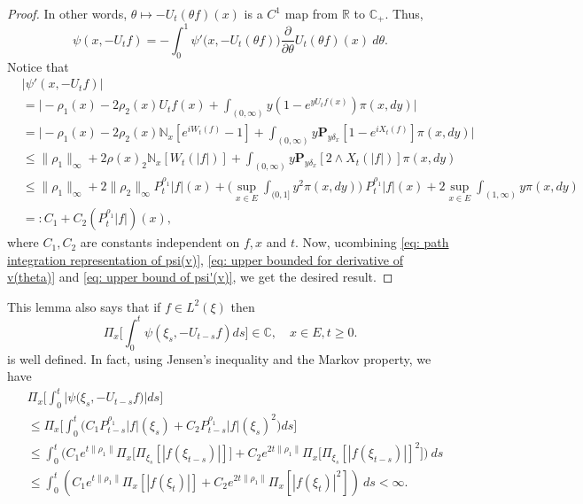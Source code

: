 \documentclass[12pt,a4paper]{amsart}
\theoremstyle{plain}
\theoremstyle{definition}
\numberwithin{equation}{section}
\begin{document}
\begin{proof}
    In other words, $\theta \mapsto -U_t(\theta f)(x)$ is a $C^1$ map from $\mathbb R$ to $\mathbb C_+$.
Thus,
\begin{equation}
\label{eq: path integration representation of psi(v)}
    \psi(x,-U_tf) = -\int_0^1 \psi'\big(x,-U_t(\theta f)\big) \frac{\partial}{\partial \theta} U_t(\theta f)(x)~d\theta.
\end{equation}
    Notice that
\begin{equation}
\label{eq: upper bound of psi'(v)}
\begin{split}
    &|\psi'(x, -U_tf)|
    \\&= \Big| -\rho_1(x)- 2\rho_2(x) U_tf(x)+ \int_{(0,\infty)} y (1- e^{y U_tf(x)} ) \pi(x,dy)\Big|
    \\&= \Big| - \rho_1(x)- 2\rho_2(x)\mathbb N_x[e^{i W_{t}(f)} - 1]  + \int_{(0,\infty)} y \mathbf P_{y \delta_x}[1-e^{i X_{t}(f)}] \pi(x,dy) \Big|
\\ &\leq \|\rho_1\|_\infty + 2\rho(x)_2\mathbb N_x[W_t(|f|)]+ \int_{(0,\infty)} y\mathbf P_{y\delta_x}[2\wedge X_t(|f|)] \pi(x,dy)
\\ &\leq \|\rho_1\|_\infty + 2\|\rho_2\|_\infty
  P^{\rho_1}_t |f|(x) + \Big(\sup_{x\in E}\int_{(0,1]}y^2 \pi(x,dy)\Big)~P^{\rho_1}_t |f|(x)
  + 2\sup_{x\in E}\int_{(1,\infty)} y \pi(x,dy)
 \\ &=: C_1 + C_2(P^{\rho_1}_t |f|)(x),
\end{split}
\end{equation}
    where $C_1, C_2$ are constants independent on $f,x$ and $t$.
    Now, ucombining \eqref{eq: path integration representation of psi(v)}, \eqref{eq: upper bounded for derivative of v(theta)} and \eqref{eq: upper bound of psi'(v)}, we get the desired result.
\end{proof}



    This lemma also says that if $f\in L^2(\xi)$ then 
\[
    \Pi_x\Big[\int_0^t \psi(\xi_s,- U_{t-s}f)ds\Big]
    \in \mathbb C,
    \quad x\in E, t\geq 0.
\]
    is well defined.
    In fact, using Jensen's inequality and the Markov property, we have
\begin{equation}\begin{split}
\label{eq: domination of psi(v)}
    &\Pi_x\Big[\int_0^t \big|\psi \big(\xi_s,-U_{t-s}f\big)\big|ds\Big]
    \\&\leq \Pi_x\Big[\int_0^t \big(C_1 P_{t-s}^{\rho_1}|f|(\xi_s)+C_2 P_{t-s}^{\rho_1}|f|(\xi_s)^2\big)ds\Big]
    \\ &\leq \int_0^t \big(C_1 e^{t\|\rho_1\|}\Pi_x \big[ \Pi_{\xi_s}[|f(\xi_{t-s})|] \big]+C_2 e^{2t\|\rho_1\|}\Pi_x \big[ \Pi_{\xi_s}[|f (\xi_{t-s})|]^2 \big]\big)~ds
    \\ &\leq \int_0^t (C_1 e^{t\|\rho_1\|}\Pi_x [ |f(\xi_{t})|]+C_2e^{2t\|\rho_1\|}\Pi_x [ |f (\xi_{t})|^2 ])~ds < \infty.
\end{split}\end{equation}
\end{document}
